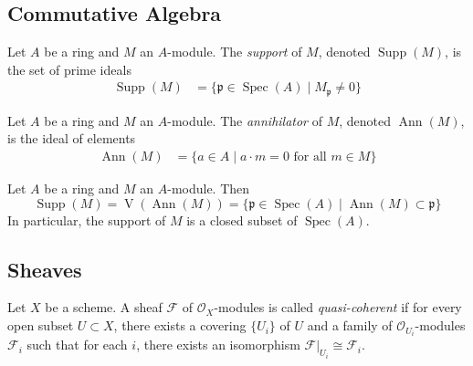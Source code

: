 \documentclass[12pt]{article}
\begin{document}
\subsection{Commutative Algebra}

\begin{definition}
    Let $A$ be a ring and $M$ an $A$-module. The \textit{support} of $M$, denoted $\operatorname{Supp}(M)$, is the set of prime ideals
    \begin{align*}
        \operatorname{Supp}(M) & = \{\mathfrak{p} \in \operatorname{Spec}(A) \mid M_{\mathfrak{p}} \neq 0\}
    \end{align*}
\end{definition}

\begin{definition}
    Let $A$ be a ring and $M$ an $A$-module. The \textit{annihilator} of $M$, denoted $\operatorname{Ann}(M)$, is the ideal of elements
    \begin{align*}
        \operatorname{Ann}(M) & = \{a \in A \mid a \cdot m = 0 \text{ for all } m \in M\} 
    \end{align*}
\end{definition}

\begin{proposition}
    Let $A$ be a ring and $M$ an $A$-module. Then \[\operatorname{Supp}(M) = \operatorname{V}(\operatorname{Ann}(M)) = \{\mathfrak{p} \in \operatorname{Spec}(A) \mid \operatorname{Ann}(M) \subset \mathfrak{p}\}\] In particular, the support of $M$ is a closed subset of $\operatorname{Spec}(A)$.

\end{proposition}

\subsection{Sheaves}

\begin{definition}
    Let $X$ be a scheme. A sheaf $\mathcal{F}$ of $\mathcal{O}_X$-modules is called \textit{quasi-coherent} if for every open subset $U \subset X$, there exists a covering $\{U_i\}$ of $U$ and a family of $\mathcal{O}_{U_i}$-modules $\mathcal{F}_i$ such that for each $i$, there exists an isomorphism $\mathcal{F}|_{U_i} \cong \mathcal{F}_i$.
\end{definition}
\end{document}
